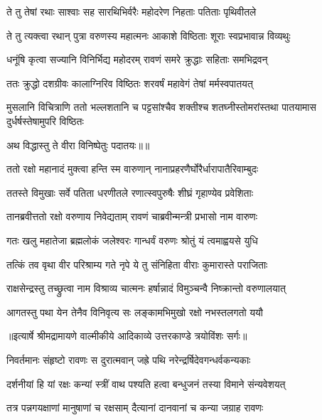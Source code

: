 \twolineshloka
{ते तु तेषां रथाः साश्वाः सह सारथिभिर्वरैः}
{महोदरेण निहताः पतिताः पृथिवीतले} %

\twolineshloka
{ते तु त्यक्त्वा रथान् पुत्रा वरुणस्य महात्मनः}
{आकाशे विष्ठिताः शूराः स्वप्रभावान्न विव्यथुः} %

\twolineshloka
{धनूंषि कृत्वा सज्यानि विनिर्भिद्य महोदरम्}
{रावणं समरे क्रुद्धाः सहिताः समभिद्रवन्} %

\twolineshloka
{ततः क्रुद्धो दशग्रीवः कालाग्निरिव विष्ठितः}
{शरवर्षं महावेगं तेषां मर्मस्वपातयत्} %

\threelineshloka
{मुसलानि विचित्राणि ततो भल्लशतानि च}
{पट्टसांश्चैव शक्तीश्च शतघ्नीस्तोमरांस्तथा}
{पातयामास दुर्धर्षस्तेषामुपरि विष्ठितः} %

{अथ विद्धास्तु ते वीरा विनिष्पेतुः पदातयः॥॥} %

\addtocounter{shlokacount}{1}

\twolineshloka
{ततो रक्षो महानादं मुक्त्वा हन्ति स्म वारुणान्}
{नानाप्रहरणैर्घोरैर्धारापातैरिवाम्बुदः} %

\twolineshloka
{ततस्ते विमुखाः सर्वे पतिता धरणीतले}
{रणात्स्वपुरुषैः शीघ्रं गृहाण्येव प्रवेशिताः} %

\twolineshloka
{तानब्रवीत्ततो रक्षो वरुणाय निवेद्यताम्}
{रावणं चाब्रवीन्मन्त्री प्रभासो नाम वारुणः} %

\twolineshloka
{गतः खलु महातेजा ब्रह्मलोकं जलेश्वरः}
{गान्धर्वं वरुणः श्रोतुं यं त्वमाह्वयसे युधि} %

\twolineshloka
{तत्किं तव वृथा वीर परिश्राम्य गते नृपे}
{ये तु संनिहिता वीराः कुमारास्ते पराजिताः} %

\twolineshloka
{राक्षसेन्द्रस्तु तच्छ्रुत्वा नाम विश्राव्य चात्मनः}
{हर्षान्नादं विमुञ्चन्वै निष्क्रान्तो वरुणालयात्} %

\twolineshloka
{आगतस्तु पथा येन तेनैव विनिवृत्य सः}
{लङ्कामभिमुखो रक्षो नभस्तलगतो ययौ} %


{॥इत्यार्षे श्रीमद्रामायणे वाल्मीकीये आदिकाव्ये उत्तरकाण्डे त्रयोविंशः सर्गः॥}


\twolineshloka
{निवर्तमानः संहृष्टो रावणः स दुरात्मवान्}
{जह्रे पथि नरेन्द्रर्षिदेवगन्धर्वकन्यकाः} %

\twolineshloka
{दर्शनीयां हि यां रक्षः कन्यां स्त्रीं वाथ पश्यति}
{हत्वा बन्धुजनं तस्या विमाने संन्यवेशयत्} %

\twolineshloka
{तत्र पन्नगयक्षाणां मानुषाणां च रक्षसाम्}
{दैत्यानां दानवानां च कन्या जग्राह रावणः} %

